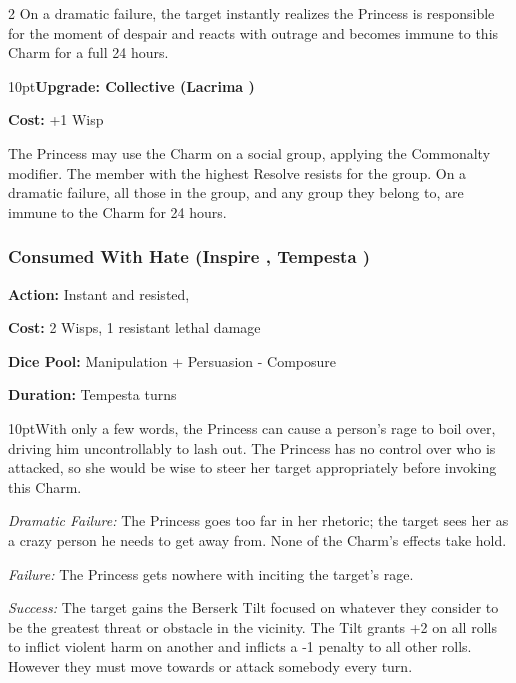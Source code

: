 \begin{multicols}{2}
On a dramatic failure, the target instantly realizes the Princess is responsible for the moment of despair and reacts with outrage and becomes immune to this Charm for a full 24 hours.

\begin{myindentpar}{10pt}\textbf{Upgrade: Collective (Lacrima \textbullet\textbullet\textbullet\textbullet)}

\noindent \textbf{Cost:} +1 Wisp

The Princess may use the Charm on a social group, applying the Commonalty modifier. The member with the highest Resolve resists for the group. On a dramatic failure, all those in the group, and any group they belong to, are immune to the Charm for 24 hours.\end{myindentpar}

\subsubsection*{Consumed With Hate (Inspire \textbullet\textbullet\textbullet\textbullet, Tempesta \textbullet\textbullet\textbullet)}

\noindent \textbf{Action:} Instant and resisted, 

\noindent \textbf{Cost:} 2 Wisps, 1 resistant lethal damage

\noindent \textbf{Dice Pool:} Manipulation + Persuasion - Composure

\noindent \textbf{Duration:} Tempesta turns \\

\begin{myindentpar}{10pt}\noindent With only a few words, the Princess can cause a person's rage to boil over, driving him uncontrollably to lash out. The Princess has no control over who is attacked, so she would be wise to steer her target appropriately before invoking this Charm.

    \emph{Dramatic Failure:} The Princess goes too far in her rhetoric; the target sees her as a crazy person he needs to get away from. None of the Charm's effects take hold.

    \emph{Failure:} The Princess gets nowhere with inciting the target's rage.

    \emph{Success:} The target gains the Berserk Tilt focused on whatever they consider to be the greatest threat or obstacle in the vicinity. The Tilt grants +2 on all rolls to inflict violent harm on another and inflicts a -1 penalty to all other rolls. However they must move towards or attack somebody every turn.


\end{myindentpar}
\end{multicols}
